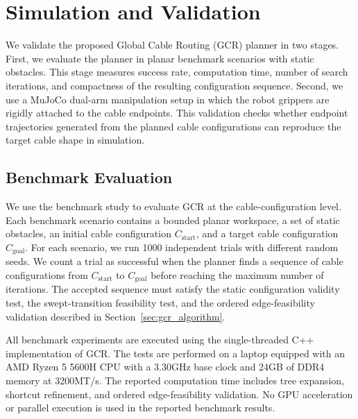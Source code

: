 \documentclass{pas}
\begin{document}

\section{Simulation and Validation}
\label{sec:simulation_validation}

We validate the proposed Global Cable Routing (GCR) planner in two stages.
First, we evaluate the planner in planar benchmark scenarios with static obstacles. This stage measures success rate, computation time, number of search iterations, and compactness of the resulting configuration sequence. Second, we use a MuJoCo dual-arm manipulation setup in which the robot grippers are rigidly attached to the cable endpoints. This validation checks whether endpoint trajectories generated from the planned cable configurations can reproduce the target cable shape in simulation.

\subsection{Benchmark Evaluation}
\label{subsec:benchmark_evaluation}

We use the benchmark study to evaluate GCR at the cable-configuration level.
Each benchmark scenario contains a bounded planar workspace, a set of static obstacles, an initial cable configuration $C_{\mathrm{start}}$, and a target cable configuration $C_{\mathrm{goal}}$.
For each scenario, we run 1000 independent trials with different random seeds.
We count a trial as successful when the planner finds a sequence of cable configurations from $C_{\mathrm{start}}$ to $C_{\mathrm{goal}}$ before reaching the maximum number of iterations.
The accepted sequence must satisfy the static configuration validity test, the swept-transition feasibility test, and the ordered edge-feasibility validation described in Section~\ref{sec:gcr_algorithm}.

All benchmark experiments are executed using the single-threaded C++ implementation of GCR.
The tests are performed on a laptop equipped with an AMD Ryzen 5 5600H CPU with a 3.30GHz base clock and 24GB of DDR4 memory at 3200MT/s.
The reported computation time includes tree expansion, shortcut refinement, and ordered edge-feasibility validation.
No GPU acceleration or parallel execution is used in the reported benchmark results.
\end{document}
